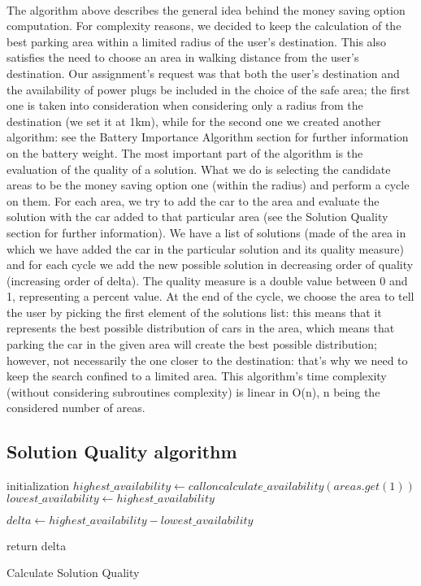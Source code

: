 \paragraph{}The algorithm above describes the general idea behind the money saving option computation. For complexity reasons, we decided to keep the calculation of the best parking area within a limited radius of the user's destination. This also satisfies the need to choose an area in walking distance from the user's destination. 
Our assignment's request was that both the user's destination and the availability of power plugs be included in the choice of the safe area; the first one is taken into consideration when considering only a radius from the destination (we set it at 1km), while for the second one we created another algorithm: see the Battery Importance Algorithm section for further information on the battery weight.
The most important part of the algorithm is the evaluation of the quality of a solution. What we do is selecting the candidate areas to be the money saving option one (within the radius) and perform a cycle on them. For each area, we try to add the car to the area and evaluate the solution with the car added to that particular area (see the Solution Quality section for further information). We have a list of solutions (made of the area in which we have added the car in the particular solution and its quality measure) and for each cycle we add the new possible solution in decreasing order of quality (increasing order of delta). The quality measure is a double value between 0 and 1, representing a percent value. 
At the end of the cycle, we choose the area to tell the user by picking the first element of the solutions list: this means that it represents the best possible distribution of cars in the area, which means that parking the car in the given area will create the best possible distribution; however, not necessarily the one closer to the destination: that's why we need to keep the search confined to a limited area.
This algorithm's time complexity (without considering subroutines complexity) is linear in O(n), n being the considered number of areas.

\subsection{Solution Quality algorithm}

\begin{algorithm}
	initialization\;
	$highest\_availability \leftarrow call on calculate\_availability(areas.get(1))$\;
	$lowest\_availability \leftarrow highest\_availability$\;
	
	$delta \leftarrow highest\_availability - lowest\_availability$\;
	
	return delta\;
	\caption{Calculate Solution Quality}
\end{algorithm}

